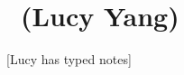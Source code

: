\renewcommand{\thespeaker}{Lucy Yang}
\renewcommand{\thetitle}{}
\section{\thetitle~(\thespeaker)}
\providecommand{\Supp}{\text{Supp}}

[Lucy has typed notes]
